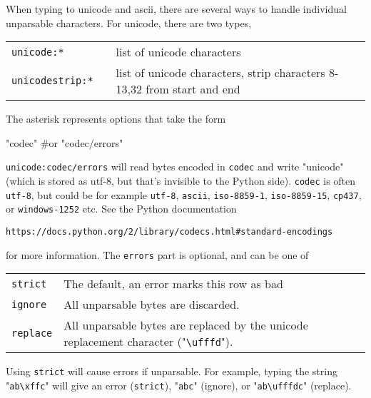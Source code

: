 When typing to unicode and ascii, there are several ways to handle
individual unparsable characters.  For unicode, there are two types,
\begin{leftbar}
\begin{tabular}{p{2cm}p{2cm}p{8cm}}
  \texttt{unicode:*}  && list of unicode characters\\
  \texttt{unicodestrip:*} && list of unicode characters, strip
  characters 8-13,32 from start and end\\
\end{tabular}
\end{leftbar}
The asterisk represents options that take the form
\begin{python}
"codec" #or
"codec/errors"
\end{python}
\texttt{unicode:codec/errors} will read bytes encoded in
\texttt{codec} and write "unicode" (which is stored as utf-8, but
that's invisible to the Python side).  \texttt{codec} is often
\texttt{utf-8}, but could be for example \texttt{utf-8},
\texttt{ascii}, \texttt{iso-8859-1}, \texttt{iso-8859-15},
\texttt{cp437}, or \texttt{windows-1252} etc.  See the Python
documentation
\begin{center}
  \texttt{https://docs.python.org/2/library/codecs.html\#standard-encodings}
\end{center}
for more information.  The \texttt{errors} part is optional, and
can be one of
\begin{snugshade}
\begin{tabular}{p{2cm}p{10cm}}
  \texttt{strict} &The default, an error marks this row as bad\\[1ex]
  \texttt{ignore} & All unparsable bytes are discarded.\\[1ex]
  \texttt{replace} & All unparsable bytes are replaced by the unicode
  replacement character ("\texttt{\textbackslash ufffd}").\\[1ex]
\end{tabular}
\end{snugshade}
\noindent Using \texttt{strict} will cause errors if unparsable.  For
example, typing the string "\texttt{ab\textbackslash xffc}" will give
an error (\texttt{strict}), "\texttt{abc}" (ignore), or
"\texttt{ab\textbackslash ufffdc}" (replace).



